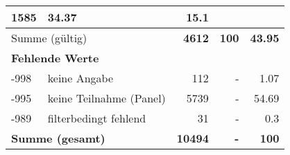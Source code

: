 \begin{longtable}{lXrrr}
       \num{1585} &
       \num[round-mode=places,round-precision=2]{34,37} &
         \num[round-mode=places,round-precision=2]{15,1} \\
     \midrule
     \multicolumn{2}{l}{Summe (gültig)} &
       \textbf{\num{4612}} &
     \textbf{100} &
       \textbf{\num[round-mode=places,round-precision=2]{43,95}} \\
     \multicolumn{5}{l}{\textbf{Fehlende Werte}}\\
       -998 &
       keine Angabe &
         \num{112} &
        - &
         \num[round-mode=places,round-precision=2]{1,07} \\
       -995 &
       keine Teilnahme (Panel) &
         \num{5739} &
        - &
         \num[round-mode=places,round-precision=2]{54,69} \\
       -989 &
       filterbedingt fehlend &
         \num{31} &
        - &
         \num[round-mode=places,round-precision=2]{0,3} \\
     \midrule
     \multicolumn{2}{l}{\textbf{Summe (gesamt)}} &
          \textbf{\num{10494}} &
        \textbf{-} &
        \textbf{100} \\
     \bottomrule
     \end{longtable}
     
